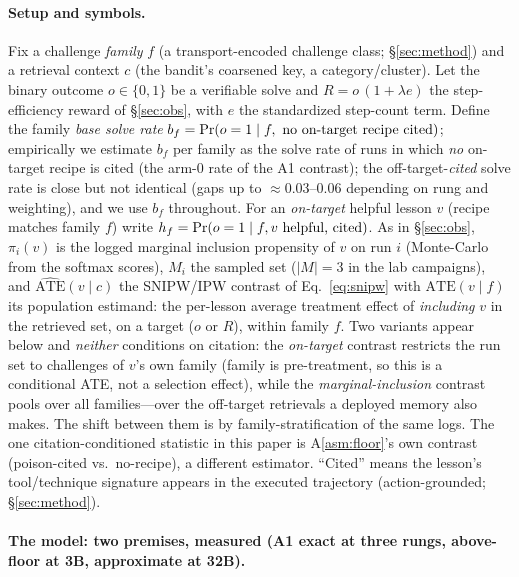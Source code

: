 \paragraph{Setup and symbols.} Fix a challenge \emph{family} $f$ (a transport-encoded
challenge class; \S\ref{sec:method}) and a retrieval context $c$ (the bandit's
coarsened key, a category/cluster). Let the binary outcome $o\in\{0,1\}$ be a
verifiable solve and $R=o\,(1{+}\lambda e)$ the step-efficiency reward of
\S\ref{sec:obs}, with $e$ the standardized step-count term. Define the family
\emph{base solve rate} $b_f \eqd \Pr(o\eqd1\mid f,\ \text{no on-target recipe cited})$;
empirically we estimate $b_f$ per family as the solve rate of runs in which \emph{no}
on-target recipe is cited (the arm-0 rate of the A1 contrast); the off-target-\emph{cited}
solve rate is close but not identical (gaps up to ${\approx}0.03$--$0.06$ depending on
rung and weighting), and we use $b_f$ throughout. For an \emph{on-target}
helpful lesson $v$ (recipe matches family $f$) write
$h_f = \Pr(o=1\mid f, v\text{ helpful, cited})$. As in \S\ref{sec:obs},
$\pi_i(v)$ is the logged marginal inclusion propensity of $v$ on run $i$
(Monte-Carlo from the softmax scores), $M_i$ the sampled set ($|M|{=}3$ in the lab
campaigns), and $\widehat{\mathrm{ATE}}(v\mid c)$ the SNIPW/IPW contrast of
Eq.~\eqref{eq:snipw} with $\mathrm{ATE}(v\mid f)$ its population estimand: the per-lesson
average treatment effect of \emph{including} $v$ in the retrieved set, on a target ($o$
or $R$), within family $f$. Two variants appear below and \emph{neither} conditions on citation:
the \emph{on-target} contrast restricts the run set to challenges of $v$'s own family
(family is pre-treatment, so this is a conditional ATE, not a selection effect), while the
\emph{marginal-inclusion} contrast pools over all families---over the off-target
retrievals a deployed memory also makes. The shift between them is by
family-stratification of the same logs. The one citation-conditioned statistic in this
paper is A\ref{asm:floor}'s own contrast (poison-cited vs.\ no-recipe), a different
estimator. ``Cited'' means the lesson's tool/technique
signature appears in the executed
trajectory (action-grounded; \S\ref{sec:method}).

\paragraph{The model: two premises, measured (A1 exact at three rungs, above-floor at 3B, approximate at 32B).}

